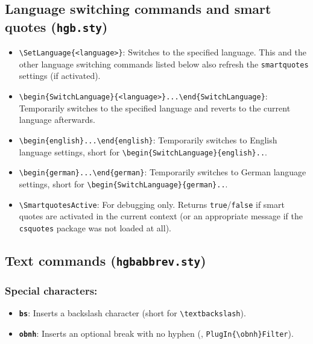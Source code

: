 \documentclass[language=english]{hgbarticle}
\begin{document}
\subsection{Language switching commands and smart quotes (\texttt{hgb.sty})}
\label{sec:LanguageSwitchingCommands}

\begin{itemize}
	\item \verb!\SetLanguage{<language>}!:
    Switches to the specified language.
		This and the other language switching commands listed below
		also refresh the \texttt{smartquotes} settings (if activated).
	\item \verb!\begin{SwitchLanguage}{<language>}...\end{SwitchLanguage}!:
    Temporarily switches to the specified language and reverts to the current language 
		afterwards. 
	\item \verb!\begin{english}...\end{english}!:
    Temporarily switches to English language settings, short for
		\verb!\begin{SwitchLanguage}{english}..!.
	\item \verb!\begin{german}...\end{german}!:
    Temporarily switches to German language settings, short for
		\verb!\begin{SwitchLanguage}{german}..!.
	\item \verb!\SmartquotesActive!:
		For debugging only. Returns \texttt{true}/\texttt{false} if smart quotes are activated in
		the current context (or an appropriate message if the \texttt{csquotes} package was not loaded at all).
\end{itemize}


\subsection{Text commands (\texttt{hgbabbrev.sty})}

\subsubsection*{Special characters:}

\begin{itemize}
    \item \textbf{\texttt{{\bs}bs}}: Inserts a backslash character (short for
    \verb!\textbackslash!).
    \item \textbf{\texttt{{\bs}obnh}}: Inserts an optional break with no
    hyphen (\eg, \verb!PlugIn{\obnh}Filter!).
\end{itemize}
\end{document}
